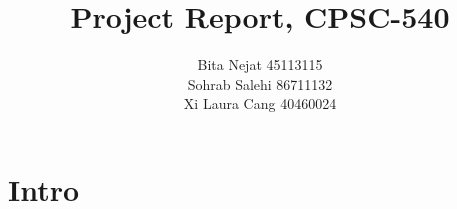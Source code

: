 \documentclass{article}
\title{Project Report, CPSC-540}
\author{
Bita Nejat 45113115 \\
Sohrab Salehi 86711132 \\
Xi Laura Cang 40460024
}
\begin{document}
\maketitle

\section{Intro}










{\footnotesize


}
\end{document}

